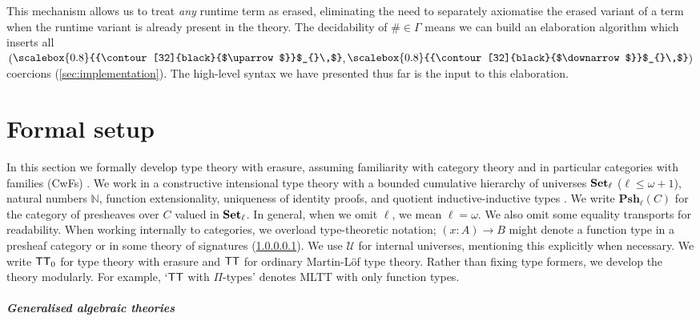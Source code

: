 \documentclass[10pt,a4paper]{article}
\theoremstyle{definition}
\theoremstyle{remark}
\newcommand{\s}[1]{{\ensuremath{\textsf{\upshape #1}}}\xspace}
\newcommand{\cl}[1]{{\ensuremath{\mathcal{#1}}}\xspace}
\newcommand{\re}[1]{{\ensuremath{\mathbf{#1}}}\xspace}
\newcommand{\std}[1]{\ensuremath{\mathbb{#1}}\xspace}
\newcommand{\mth}[1]{\ensuremath{\textbf{\upshape #1}}\xspace}
\newcommand{\Set}{\mth{Set}}
\newcommand{\univ}{\cl{U}}
\newcommand{\ZTT}{\ensuremath{\s{TT}_0}\xspace}
\newcommand{\TT}{\ensuremath{\s{TT}}\xspace}
\def\arrowscale{0.8}
\def\arrowshift{0.9pt}
\newcommand{\arrowwrap}[2]{%
  \text{\raisebox{\arrowshift}{\scalebox{\arrowscale}{{\contour[32]{black}{$#1$}}$_{#2}\,$}}}%
}
\newcommand{\uptm}[1][]{\arrowwrap{\uparrow}{#1}}
\newcommand{\downtm}[1][]{\arrowwrap{\downarrow}{#1}}
\begin{document}
This mechanism allows us to treat \emph{any} runtime term as erased, eliminating
the need to separately axiomatise the erased variant of a term when the runtime
variant is already present in the theory. The decidability of $\# \in \Gamma$
means we can build an elaboration algorithm which inserts all $(\uptm,\downtm)$
coercions (\cref{sec:implementation}). The high-level syntax we have presented
thus far is the input to this elaboration.

\section{Formal setup} \label{sec:formal}

In this section we formally develop type theory with erasure, assuming
familiarity with category theory and in particular categories with families
(CwFs) \cite{Castellan2019-sh}. We work in a constructive intensional type
theory with a bounded cumulative hierarchy of universes $\Set_\ell$ ($\ell \leq
\omega + 1$), natural numbers $\std N$, function extensionality, uniqueness of
identity proofs, and quotient inductive-inductive types
\cite{Altenkirch2018-nd}. We write $\re{Psh}_{\ell}(C)$ for the category of
presheaves over $C$ valued in $\Set_\ell$. In general, when we omit $\ell$, we
mean $\ell = \omega$. We also omit some equality transports for readability.
When working internally to categories, we overload type-theoretic notation; $(x
: A) \to B$ might denote a function type in a presheaf category
\cite{Hofmann1997-on} or in some theory of signatures (\cref{par:gat}). We use
$\univ$ for internal universes, mentioning this explicitly when necessary. We
write \ZTT for type theory with erasure and \TT for ordinary Martin-L\"of type
theory. Rather than fixing type formers, we develop the theory modularly. For
example, `\TT with $\Pi$-types' denotes MLTT with only function types.

\subparagraph{Generalised algebraic theories}\label{par:gat}
\end{document}
